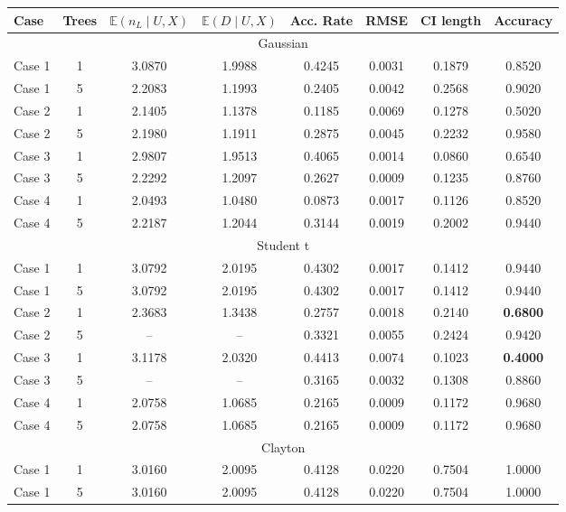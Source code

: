 \documentclass{amsart}
\begin{document}
\begin{table}[ht]
	\centering
	\scriptsize{
	\begin{tabular}{lc|cccccc}
		\toprule
		Case & Trees & $\mathbb{E}(n_L\mid U,X)$ & $\mathbb{E}(D\mid U,X)$ & Acc. Rate & RMSE & CI length & Accuracy \\ 
		\midrule
		\multicolumn{8}{c}{Gaussian} \\
		\midrule
		Case 1 & 1 & 3.0870 & 1.9988 & 0.4245 & 0.0031 & 0.1879 & 0.8520 \\ 
		Case 1 & 5 & 2.2083 & 1.1993 & 0.2405 & 0.0042 & 0.2568 & 0.9020 \\ 
		Case 2 & 1 & 2.1405 & 1.1378 & 0.1185 & 0.0069 & 0.1278 & 0.5020 \\ 
		Case 2 & 5 & 2.1980 & 1.1911 & 0.2875 & 0.0045 & 0.2232 & 0.9580 \\ 
		Case 3 & 1 & 2.9807 & 1.9513 & 0.4065 & 0.0014 & 0.0860 & 0.6540 \\
		Case 3 & 5 & 2.2292 & 1.2097 & 0.2627 & 0.0009 & 0.1235 & 0.8760 \\ 
		Case 4 & 1 & 2.0493 & 1.0480 & 0.0873 & 0.0017 & 0.1126 & 0.8520 \\ 
		Case 4 & 5 & 2.2187 & 1.2044 & 0.3144 & 0.0019 & 0.2002 & 0.9440 \\ 
		\midrule
		\multicolumn{8}{c}{Student t} \\
		\midrule
		Case 1 & 1 & 3.0792 & 2.0195 & 0.4302 & 0.0017 & 0.1412 & 0.9440 \\ 
		Case 1 & 5 & 3.0792 & 2.0195 & 0.4302 & 0.0017 & 0.1412 & 0.9440 \\ 
		Case 2 & 1 & 2.3683 & 1.3438 & 0.2757 & 0.0018 & 0.2140 & \textbf{0.6800} \\ 
		Case 2 & 5 & -- & -- & 0.3321 & 0.0055 & 0.2424 & 0.9420 \\
		Case 3 & 1 & 3.1178 & 2.0320 & 0.4413 & 0.0074 & 0.1023 & \textbf{0.4000} \\ 
		Case 3 & 5 & -- & -- & 0.3165 & 0.0032 & 0.1308 & 0.8860 \\
		Case 4 & 1 & 2.0758 & 1.0685 & 0.2165 & 0.0009 & 0.1172 & 0.9680 \\ 
		Case 4 & 5 & 2.0758 & 1.0685 & 0.2165 & 0.0009 & 0.1172 & 0.9680 \\ 
		\midrule
		\multicolumn{8}{c}{Clayton} \\
		\midrule
		Case 1 & 1 & 3.0160 & 2.0095 & 0.4128 & 0.0220 & 0.7504 & 1.0000 \\ 
		Case 1 & 5 & 3.0160 & 2.0095 & 0.4128 & 0.0220 & 0.7504 & 1.0000 \\ 

\end{tabular}}
\end{table}
\end{document}
